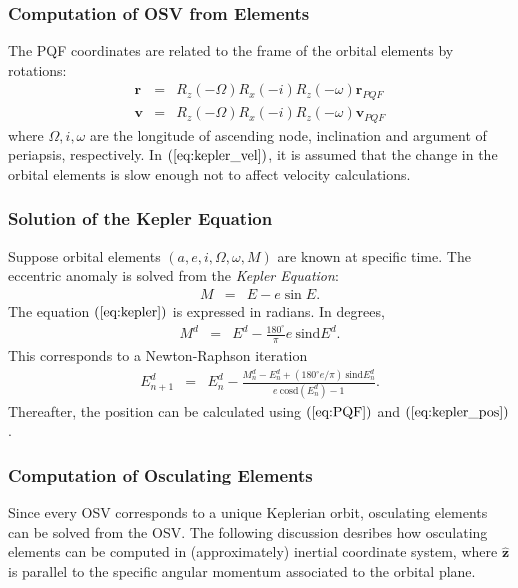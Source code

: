 \documentclass [12pt, a4paper] {article}
\newcommand{\sind}
{
	\textrm{sind}
}
\newcommand{\cosd}
{
	\textrm{cosd}
}
\newcommand{\vu}[1]
{
	\mathbf{\hat #1}
}
\newcommand{\vc}[1]
{
	\boldsymbol{#1}
}
\begin{document}
\subsubsection{Computation of OSV from Elements}
The PQF coordinates are related to the frame of the orbital elements by 
rotations:
\begin {eqnarray}
  \label{eq:kepler_pos}
  \vc r &=& R_z(-\Omega)R_x(-i)R_z(-\omega) \vc r_{PQF}\\
  \label{eq:kepler_vel}
  \vc v &=& R_z(-\Omega)R_x(-i)R_z(-\omega) \vc v_{PQF}
\end {eqnarray}
where $\Omega, i, \omega$ are the longitude of ascending node, inclination 
and argument of periapsis, respectively. In $(\ref{eq:kepler_vel})$, it is 
assumed that the change in the orbital elements is slow enough not to affect 
velocity calculations.

\subsubsection{Solution of the Kepler Equation}
Suppose orbital elements $(a, e, i, \Omega, \omega, M)$ are known at 
specific time. The eccentric anomaly is solved from the \emph{Kepler Equation}:
\begin {eqnarray}
  \label{eq:kepler}
  M &=& E - e\sin E.
\end {eqnarray}
The equation $(\ref{eq:kepler})$ is expressed in radians. In degrees,
\begin {eqnarray}
\label{eq:kepler_deg}
M^d &=& E^d - \frac{180^\circ}{\pi}e\:\sind E^d.
\end {eqnarray}
This corresponds to a Newton-Raphson iteration
\begin {eqnarray}
  E^d_{n+1} &=& E^d_n 
  - 
  \frac{M_n^d - E_n^d + (180^\circ e/\pi)\:\sind{E_n^d}}{e\:\cosd(E_n^d) - 1}.
\end {eqnarray}
Thereafter, the position can be calculated using $(\ref{eq:PQF})$ and 
$(\ref{eq:kepler_pos})$.

\subsubsection{Computation of Osculating Elements}
Since every OSV corresponds to a unique Keplerian orbit, osculating elements 
can be solved from the OSV. The following discussion desribes how osculating
elements can be computed in (approximately) inertial coordinate system, where 
$\vu z$ is parallel to the specific angular momentum associated to the orbital 
plane.
\end{document}
